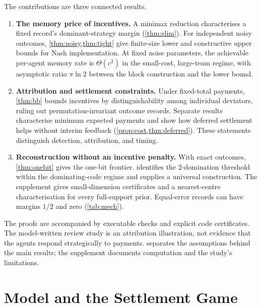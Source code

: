 \documentclass[sigconf,anonymous,acmthm=false]{aamas}
\theoremstyle{acmplain}
\theoremstyle{acmdefinition}
\begin{document}
The contributions are three connected results.
\begin{enumerate}
\item \textbf{The memory price of incentives.} A minimax reduction characterises a fixed
record's dominant-strategy margin (\cref{thm:elim}). For independent noisy outcomes,
\cref{thm:noisy,thm:tight} give finite-size lower and constructive upper bounds for Nash
implementation. At fixed noise parameters, the achievable per-agent memory rate is
$\Theta(c^2)$ in the small-cost, large-team regime, with asymptotic ratio $\pi\ln2$ between
the block construction and the lower bound.
\item \textbf{Attribution and settlement constraints.} Under fixed-total payments,
\cref{thm:bb} bounds incentives by distinguishability among individual deviators, ruling out
permutation-invariant outcome records. Separate results characterise minimum expected
payments and show how deferred settlement helps without interim feedback
(\cref{prop:cost,thm:deferred}). These statements distinguish detection, attribution, and timing.
\item \textbf{Reconstruction without an incentive penalty.} With exact outcomes,
\cref{thm:onebit} gives the one-bit frontier.  identifies the 2-domination
threshold within the dominating-code regime and supplies a universal construction. The
supplement gives small-dimension certificates and a nearest-centre characterisation for
every full-support prior. Equal-error records can have margins $1/2$ and zero
(\cref{tab:mech}).
\end{enumerate}
The proofs are accompanied by executable checks and explicit code certificates. The
model-written review study is an attribution illustration, not evidence that the agents
respond strategically to payments.  separates the assumptions behind the
main results; the supplement documents computation and the study's limitations.

\section{Model and the Settlement Game}\label{sec:model}
\end{document}
